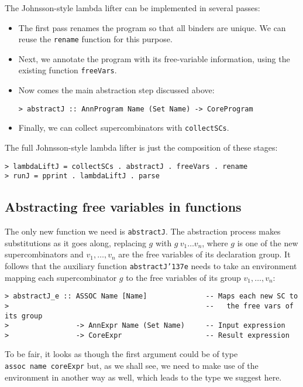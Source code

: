 The Johnsson-style lambda lifter can be implemented in several passes:
\begin{itemize}
\item
The first pass renames the program so that all binders are unique.  We
can reuse the \mbox{\tt rename} function for this purpose.

\item
Next, we annotate the program with its free-variable information, using
the existing function \mbox{\tt freeVars}.

\item
Now comes the main abstraction step discussed above:
\begin{verbatim}
> abstractJ :: AnnProgram Name (Set Name) -> CoreProgram
\end{verbatim}
%
\item
Finally, we can collect supercombinators with \mbox{\tt collectSCs}.
\end{itemize}
The full Johnsson-style lambda lifter is just the composition of these
stages:
\begin{verbatim}
> lambdaLiftJ = collectSCs . abstractJ . freeVars . rename
> runJ = pprint . lambdaLiftJ . parse
\end{verbatim}
%
%
\subsection{Abstracting free variables in functions}

The only new function we need is \mbox{\tt abstractJ}.  The abstraction process
makes substitutions as it goes along, replacing $g$ with $g~v_1\ldots
v_n$, where $g$ is one of the new supercombinators and
$v_1,\ldots,v_n$ are the free variables of its declaration group.  It
follows that the auxiliary function \mbox{\tt abstractJ{\char'137}e} needs to take an
environment mapping each supercombinator $g$ to the free variables of
its group $v_1,\ldots,v_n$:
\begin{verbatim}
> abstractJ_e :: ASSOC Name [Name]              -- Maps each new SC to
>                                               --   the free vars of its group
>                -> AnnExpr Name (Set Name)     -- Input expression
>                -> CoreExpr                    -- Result expression
\end{verbatim}
To be fair, it looks as though the first argument could be of type
\mbox{\tt assoc\ name\ coreExpr} but, as we shall see, we need to make use of the
environment in another way as well, which leads to the type we suggest
here.

